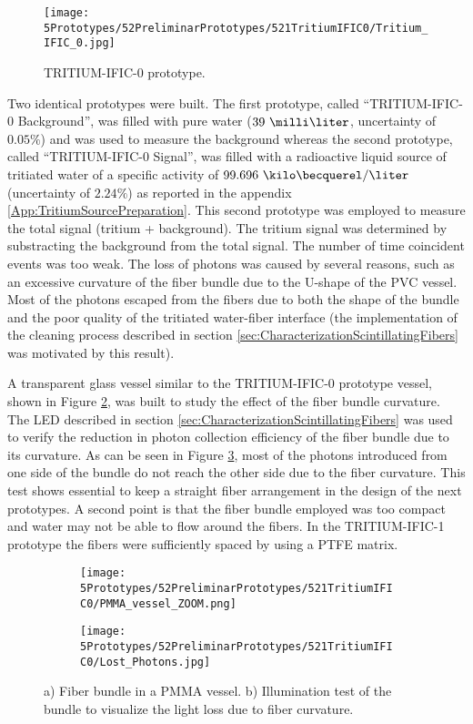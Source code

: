 \begin{figure}[h]
\centering
\texttt{[image: 5Prototypes/52PreliminarPrototypes/521TritiumIFIC0/Tritium\_IFIC\_0.jpg]}
\caption{TRITIUM-IFIC-0 prototype.\label{fig:TritiumIFIC0}}
\end{figure}

Two identical prototypes were built. The first prototype, called ``TRITIUM-IFIC-0 Background'', was filled with pure water ($39~\milli\liter$, uncertainty of $0.05\%$) and was used to measure the background whereas the second prototype, called ``TRITIUM-IFIC-0 Signal'', was filled with a radioactive liquid source of tritiated water of a specific activity of $99.696~\kilo\becquerel/\liter$ (uncertainty of $2.24\%$) as reported in the appendix \ref{App:TritiumSourcePreparation}. This second prototype was employed to measure the total signal (tritium + background). The tritium signal was determined by substracting the background from the total signal. The number of time coincident events was too weak. The loss of photons was caused by several reasons, such as an excessive curvature of the fiber bundle due to the U-shape of the PVC vessel. Most of the photons escaped from the fibers due to both the shape of the bundle and the poor quality of the tritiated water-fiber interface (the implementation of the cleaning process described in section \ref{sec:CharacterizationScintillatingFibers} was motivated by this result). 

A transparent glass vessel similar to the TRITIUM-IFIC-0 prototype vessel, shown in Figure \ref{subfig:PMMAVesselToTestLostPhotons}, was built to study the effect of the fiber bundle curvature. The LED described in section \ref{sec:CharacterizationScintillatingFibers} was used to verify the reduction in photon collection efficiency of the fiber bundle due to its curvature. As can be seen in Figure \ref{subfig:TestLostPhotons}, most of the photons introduced from one side of the bundle do not reach the other side due to the fiber curvature. This test shows essential to keep a straight fiber arrangement in the design of the next prototypes. A second point is that the fiber bundle employed was too compact and water may not be able to flow around the fibers. In the TRITIUM-IFIC-1 prototype the fibers were sufficiently spaced by using a PTFE matrix.

\begin{figure}
\centering
    \begin{subfigure}[b]{0.45\textwidth}
    \centering
    \texttt{[image: 5Prototypes/52PreliminarPrototypes/521TritiumIFIC0/PMMA\_vessel\_ZOOM.png]}  
    \caption{\label{subfig:PMMAVesselToTestLostPhotons}}
    \end{subfigure}
    \hfill
    \begin{subfigure}[b]{0.45\textwidth}
    \centering
    \texttt{[image: 5Prototypes/52PreliminarPrototypes/521TritiumIFIC0/Lost\_Photons.jpg]}  
    \caption{\label{subfig:TestLostPhotons}}
    \end{subfigure}
 \caption{a) Fiber bundle in a PMMA vessel. b) Illumination test of the bundle to visualize the light loss due to fiber curvature.}
 \label{fig:TestLostPhotons}
\end{figure}

